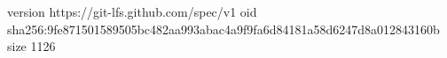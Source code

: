 version https://git-lfs.github.com/spec/v1
oid sha256:9fe871501589505bc482aa993abac4a9f9fa6d84181a58d6247d8a012843160b
size 1126
